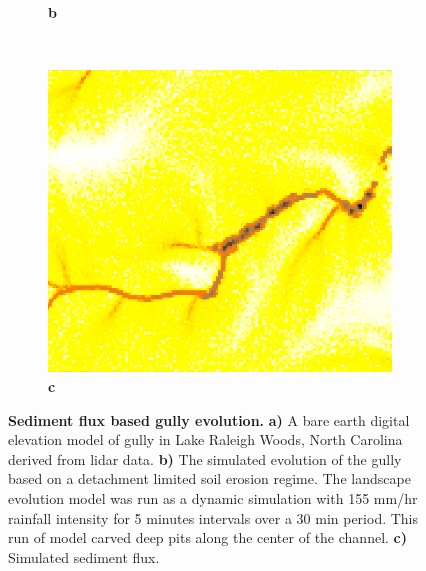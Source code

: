 \documentclass[10pt,letterpaper]{article}
\begin{document}
\begin{figure}
\begin{subfigure}[b]{0.3\textwidth}
\label{fig_1_2}
\textbf{b} \\
\end{subfigure}
%
~ %
%
\begin{subfigure}[b]{0.3\textwidth}
\includegraphics[width=\textwidth]{images/lrwoods_dynamics_erdep_5m_30m_flux.png} %
\label{fig_1_3}
\textbf{c} \\
\end{subfigure}
%
\caption{{\bf Sediment flux based gully evolution.}
\textbf{a)}
A bare earth digital elevation model of gully in Lake Raleigh Woods, North Carolina derived from lidar data.
\textbf{b)}
The simulated evolution of the gully based on a detachment limited soil erosion regime.
The landscape evolution model was run as a dynamic simulation with 155 mm/hr rainfall intensity for 5 minutes intervals over a 30 min period.
This run of model carved deep pits along the center of the channel.
\textbf{c)}
Simulated sediment flux. 
}
\label{fig_1}
\end{figure}
\end{document}
